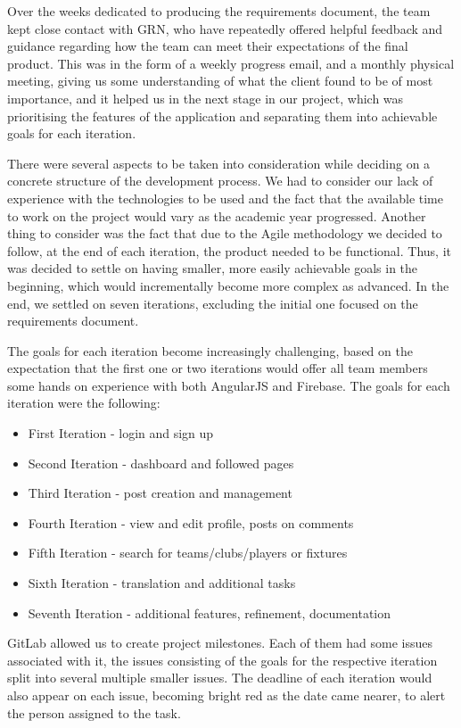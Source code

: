 \documentclass{l3proj}
\begin{document}
Over the weeks dedicated to producing the requirements document, the team
 kept close contact with GRN, who have repeatedly offered helpful feedback
 and guidance regarding how the team can meet their expectations of the
 final product. This was in the form of a weekly progress email, and a monthly
 physical meeting, giving us some understanding of what the client found
 to be of most importance, and it helped us in the next stage in our
 project, which was prioritising the features of the application and separating
 them into achievable goals for each iteration.

There were several aspects to be taken into consideration while deciding
 on a concrete structure of the development process. We had to consider
 our lack of experience with the technologies to be used and the fact
 that the available time to work on the project would vary as the academic
 year progressed. Another thing to consider was the fact that due to the
 Agile methodology we decided to follow, at the end of each iteration, the
 product needed to be functional. Thus, it was decided to settle on having
 smaller, more easily achievable goals in the beginning, which would
 incrementally become more complex as advanced. In the end, we settled
 on seven iterations, excluding the initial one focused on the requirements
 document.

The goals for each iteration become increasingly challenging, based on the
 expectation that the first one or two iterations would offer all team
 members some hands on experience with both AngularJS and Firebase. The
 goals for each iteration were the following:
\begin{itemize}
\item First Iteration - login and sign up
\item Second Iteration - dashboard and followed pages
\item Third Iteration - post creation and management
\item Fourth Iteration - view and edit profile, posts on comments
\item Fifth Iteration - search for teams/clubs/players or fixtures
\item Sixth Iteration - translation and additional tasks
\item Seventh Iteration - additional features, refinement, documentation
\end{itemize}



GitLab allowed us to create project milestones. Each of them had some
 issues associated with it, the issues consisting of the goals for the
 respective iteration split into several multiple smaller issues. The deadline
 of each iteration would also appear on each issue, becoming bright red as the
 date came nearer, to alert the person assigned to the task.
\end{document}

